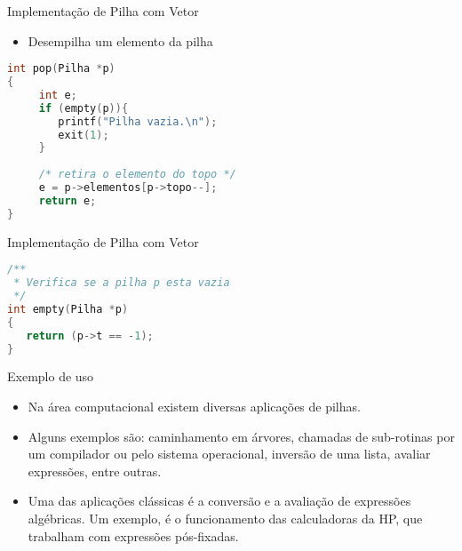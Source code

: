 \begin{frame}[fragile]{Implementação de Pilha com Vetor}
\begin{itemize}
	\item Desempilha um elemento da pilha
\end{itemize}
\begin{lstlisting}[language=C]
int pop(Pilha *p)
{
     int e;
     if (empty(p)){
        printf("Pilha vazia.\n");
        exit(1);             
     } 
     
     /* retira o elemento do topo */
     e = p->elementos[p->topo--];
     return e;
}	
\end{lstlisting}  
\end{frame}


\begin{frame}[fragile]{Implementação de Pilha com Vetor}
\begin{lstlisting}[language=C]
/**
 * Verifica se a pilha p esta vazia
 */
int empty(Pilha *p)
{
   return (p->t == -1);
}

\end{lstlisting}
\end{frame}

\begin{frame}{Exemplo de uso}
\begin{itemize}
	\item Na área computacional existem diversas aplicações de pilhas. 
	\item Alguns exemplos são: caminhamento em árvores, chamadas de sub-rotinas por um compilador ou pelo sistema operacional, inversão de uma lista, avaliar expressões, entre outras.
	\item Uma das aplicações clássicas é a conversão e a avaliação de expressões algébricas. Um exemplo, é o funcionamento das calculadoras da HP, que trabalham com expressões pós-fixadas.
\end{itemize}
\end{frame}

